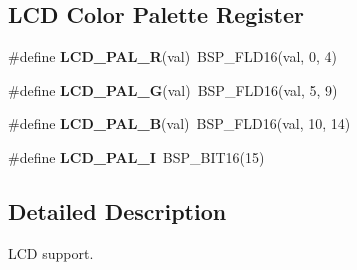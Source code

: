 \subsection*{L\+CD Color Palette Register}
\begin{DoxyCompactItemize}
\item 
\mbox{\label{group__lpc__lcd_ga659121d870cb30a730c88cc9339ca1ca}} 
\#define {\bfseries L\+C\+D\+\_\+\+P\+A\+L\+\_\+R}(val)~B\+S\+P\+\_\+\+F\+L\+D16(val, 0, 4)
\item 
\mbox{\label{group__lpc__lcd_gada39c9d80f683e68c3c764eca743e672}} 
\#define {\bfseries L\+C\+D\+\_\+\+P\+A\+L\+\_\+G}(val)~B\+S\+P\+\_\+\+F\+L\+D16(val, 5, 9)
\item 
\mbox{\label{group__lpc__lcd_ga13dbb4f4928e8f36ffb7d5ae3e287ed2}} 
\#define {\bfseries L\+C\+D\+\_\+\+P\+A\+L\+\_\+B}(val)~B\+S\+P\+\_\+\+F\+L\+D16(val, 10, 14)
\item 
\mbox{\label{group__lpc__lcd_ga0874f8267a6b69174100bb55320259e7}} 
\#define {\bfseries L\+C\+D\+\_\+\+P\+A\+L\+\_\+I}~B\+S\+P\+\_\+\+B\+I\+T16(15)
\end{DoxyCompactItemize}


\subsection{Detailed Description}
L\+CD support. 


